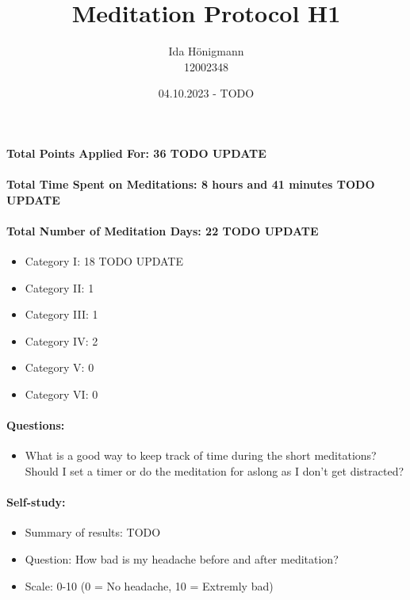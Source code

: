 \documentclass[11pt,a4paper]{article}
\begin{document}
\afterpage{\restorepagecolor}
\title{\LARGE\bfseries Meditation Protocol H1}
\author{Ida Hönigmann \\ 12002348}
\date{04.10.2023 - TODO}
\maketitle

\paragraph{Total Points Applied For: 36 TODO UPDATE}
\paragraph{Total Time Spent on Meditations: 8 hours and 41 minutes TODO UPDATE}
\paragraph{Total Number of Meditation Days: 22 TODO UPDATE}

\begin{itemize}
    \item Category I: 18 TODO UPDATE
    \item Category II: 1
    \item Category III: 1
    \item Category IV: 2
    \item Category V: 0
    \item Category VI: 0
\end{itemize}

\paragraph{Questions:}
\begin{itemize}
    \item What is a good way to keep track of time during the short meditations? Should I set a timer or do the meditation for aslong as I don't get distracted?
\end{itemize}

\paragraph{Self-study:}
\begin{itemize}
    \item Summary of results: TODO
    \item Question: How bad is my headache before and after meditation?
    \item Scale: 0-10 (0 = No headache, 10 = Extremly bad)
\end{itemize}
\end{document}
